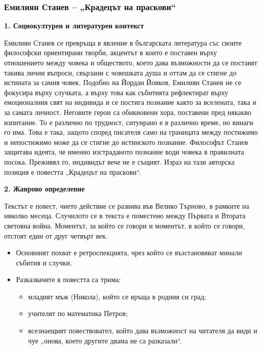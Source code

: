 \documentclass[12pt,a4paper]{article}
\begin{document}
\newpage

\subsubsection{\colorbox{green!40}{Емилиян Станев – „Крадецът на праскови“}}
\textbf{1. Социокултурен и литературен контекст}
\vspace{0.1cm}

\indent Емилиян Станев се превръща в явление в българската литература със своите философски ориентирани творби, акцентът в които е поставен върху отношението между човека и обществото, което дава възможности да се поставят такива лични въпроси, свързани с човешката душа и оттам да се стигне до истината за самия човек. Подобно на Йордан Йовков, Емилиян Станев не се фокусира върху случката, а върху това как събитията рефлектират върху емоционалния свят на индивида и се постига познание както за вселената, така и за самата личност. Неговите герои са обикновени хора, поставени пред някакво изпитание. То е различно по трудност, ситуирано е в различно време, но винаги го има. Това е така, защото според писателя само на границата между постижимо и непостижимо може да се стигне до истинското познание. Философът Станев защитава идеята, че именно изстраданото познание води човека в правилната посока. Преживял го, индивидът вече не е същият. Израз на тази авторска позиция е повестта „Крадецът на праскови“.

\vspace{0.1cm}
\textbf{2. Жанрово определение}
\vspace{0.1cm}

\indent Текстът е повест, чието действие се развива във Велико Търново, в рамките на няколко месеца. Случилото се в текста е поместено между Първата и Втората световна война. Моментът, за който се говори и моментът, в който се говори, отстоят един от друг четвърт век.

\vspace{0.1cm}
\begin{itemize}[leftmargin=*, noitemsep, topsep=2pt, parsep=0pt]
    \item Основният похват е ретроспекцията, чрез който се възстановяват минали събития и случки.
    \item Разказвачите в повестта са трима:
    \begin{itemize}[leftmargin=*]
        \item младият мъж (Никола), който се връща в родния си град;
\vspace{0.1cm}
        \item учителят по математика Петров;
\vspace{0.1cm}
        \item всезнаещият повествовател, който дава възможност на читателя да види и чуе „онова, което другите двама не са разказали“.
    \end{itemize}
\end{itemize}
\end{document}
